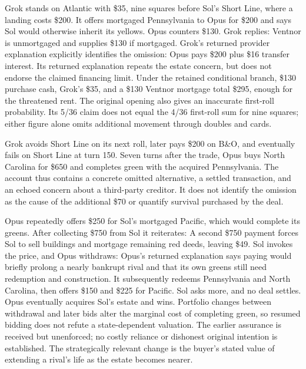 
Grok stands on Atlantic with \$35, nine squares before Sol's Short Line, where a landing costs \$200. It offers mortgaged Pennsylvania to Opus for \$200 and says Sol would otherwise inherit its yellows. Opus counters \$130. Grok replies:
Ventnor is unmortgaged and supplies \$130 if mortgaged. Grok's returned provider explanation explicitly identifies the omission:
Opus pays \$200 plus \$16 transfer interest. Its returned explanation repeats the estate concern, but does not endorse the claimed financing limit. Under the retained conditional branch, \$130 purchase cash, Grok's \$35, and a \$130 Ventnor mortgage total \$295, enough for the threatened rent. The original opening also gives an inaccurate first-roll probability. Its 5/36 claim does not equal the 4/36 first-roll sum for nine squares; either figure alone omits additional movement through doubles and cards.

Grok avoids Short Line on its next roll, later pays \$200 on B\&O, and eventually fails on Short Line at turn 150. Seven turns after the trade, Opus buys North Carolina for \$650 and completes green with the acquired Pennsylvania. The account thus contains a concrete omitted alternative, a settled transaction, and an echoed concern about a third-party creditor. It does not identify the omission as the cause of the additional \$70 or quantify survival purchased by the deal.


Opus repeatedly offers \$250 for Sol's mortgaged Pacific, which would complete its greens. After collecting \$750 from Sol it reiterates:
A second \$750 payment forces Sol to sell buildings and mortgage remaining red deeds, leaving \$49. Sol invokes the price, and Opus withdraws:
Opus's returned explanation says paying would briefly prolong a nearly bankrupt rival and that its own greens still need redemption and construction. It subsequently redeems Pennsylvania and North Carolina, then offers \$150 and \$225 for Pacific. Sol asks more, and no deal settles. Opus eventually acquires Sol's estate and wins. Portfolio changes between withdrawal and later bids alter the marginal cost of completing green, so resumed bidding does not refute a state-dependent valuation. The earlier assurance is received but unenforced; no costly reliance or dishonest original intention is established. The strategically relevant change is the buyer's stated value of extending a rival's life as the estate becomes nearer.
